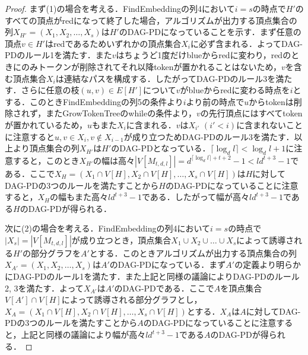 \documentclass[master]{kuisthesis}		%
\theoremstyle{plain}
\theoremstyle{definition}
\begin{document}
\begin{proof}
まず(1)の場合を考える．FindEmbeddingの列4において$i=s$の時点で$H'$のすべての頂点がredになって終了した場合，アルゴリズムが出力する頂点集合の列$X_{H'} = (X_1, X_2, \dots , X_s)$は$H'$のDAG-PDになっていることを示す．まず任意の頂点$v \in H'$はredであるためいずれかの頂点集合$X_i$に必ず含まれる．よってDAG-PDのルール1を満たす．また$v$はちょうど1度だけblueからredに変わり，redのときにのみトークンが削除されてそれ以降tokenが置かれることはないため，$v$を含む頂点集合$X_i$は連結なパスを構成する．したがってDAG-PDのルール3を満たす．さらに任意の枝$(u, v) \in E[H']$について$v$がblueからredに変わる時点を$i$とする．このときFindEmbeddingの列5の条件より$i$より前の時点で$u$からtokenは削除されず，またGrowTokenTreeのwhileの条件より，$v$の先行頂点にはすべてtokenが置かれているため，$u$もまた$X_i$に含まれる．$v$は$X_{i'}$ $(i' < i)$に含まれないことに注意すると$u, v \in X_i, v \notin X_{i-1}$が成り立つためDAG-PDのルール3を満たす．以上より頂点集合の列$X_{H'}$は$H'$のDAG-PDとなっている．$\lceil \log_d l \rceil < \log_d l +1$に注意すると，このとき$X_{H'}$の幅は高々$|V[M_{t, d, l}]| = d^{\lceil \log_d l \rceil +t+2}-1 < ld^{t+3}-1$である．ここで$X_H = (X_1 \cap V[H], X_2 \cap V[H], \dots , X_s \cap V[H])$は$H$に対してDAG-PDの3つのルールを満たすことから$H$のDAG-PDになっていることに注意すると，$X_H$の幅もまた高々$ld^{t+3}-1$である．したがって幅が高々$ld^{t+3}-1$である$H$のDAG-PDが得られる．

次に(2)の場合を考える．FindEmbeddingの列4において$i=s$の時点で$|X_s| = |V[M_{t, d, l}]|$が成り立つとき，頂点集合$X_1 \cup X_2 \cup \dots \cup X_s$によって誘導される$H'$の部分グラフを$A'$とする．このときアルゴリズムが出力する頂点集合の列$X_{A'} = (X_1, X_2, \dots , X_s)$は$A'$のDAG-PDになっている．まず$A'$の定義より明らかにDAG-PDのルール1を満たす．また上記と同様の議論によりDAG-PDのルール2, 3を満たす．よって$X_{A'}$は$A'$のDAG-PDである．ここで$A$を頂点集合$V[A'] \cap V[H]$によって誘導される部分グラフとし，$X_A = (X_1 \cap V[H], X_2 \cap V[H], \dots , X_s \cap V[H])$とする．$X_A$は$A$に対してDAG-PDの3つのルールを満たすことから$A$のDAG-PDになっていることに注意すると，上記と同様の議論により幅が高々$ld^{t+3}-1$である$A$のDAG-PDが得られる．


\end{proof}
\end{document}
